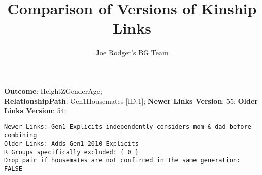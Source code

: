 \documentclass{article}\usepackage{graphicx, color}
\title{Comparison of Versions of Kinship Links}
\author{Joe Rodger's BG Team}
\makeatletter
\newenvironment{kframe}{%
 \def\at@end@of@kframe{}%
 \ifinner\ifhmode%
  \def\at@end@of@kframe{\end{minipage}}%
  \begin{minipage}{\columnwidth}%
 \fi\fi%
 \def\FrameCommand##1{\hskip\@totalleftmargin \hskip-\fboxsep
 \colorbox{shadecolor}{##1}\hskip-\fboxsep
     \hskip-\linewidth \hskip-\@totalleftmargin \hskip\columnwidth}%
 \MakeFramed {\advance\hsize-\width
   \@totalleftmargin\z@ \linewidth\hsize
   \@setminipage}}%
 {\par\unskip\endMakeFramed%
 \at@end@of@kframe}
\newenvironment{knitrout}{}{} %
\makeatother
\begin{document}
\maketitle
\setcounter{totalnumber}{8} %

\setlength{\parindent}{0pt}%




\begin{knitrout}
\color{fgcolor}\begin{kframe}


{\ttfamily\noindent\itshape\color{messagecolor}{\#\# Loading required package: Matrix}}

{\ttfamily\noindent\itshape\color{messagecolor}{\#\# Loading required package: lattice}}\end{kframe}
\end{knitrout}


\textbf{Outcome}: HeightZGenderAge;\\
\textbf{RelationshipPath}: Gen1Housemates [ID:1];
\textbf{Newer Links Version}: 55;
\textbf{Older Links Version}: 54;

\begin{knitrout}
\color{fgcolor}\begin{kframe}
\begin{verbatim}
Newer Links: Gen1 Explicits independently considers mom & dad before combining
Older Links: Adds Gen1 2010 Explicits
R Groups specifically excluded: { 0 }
Drop pair if housemates are not confirmed in the same generation: FALSE
\end{verbatim}
\end{kframe}
\end{knitrout}
\end{document}
